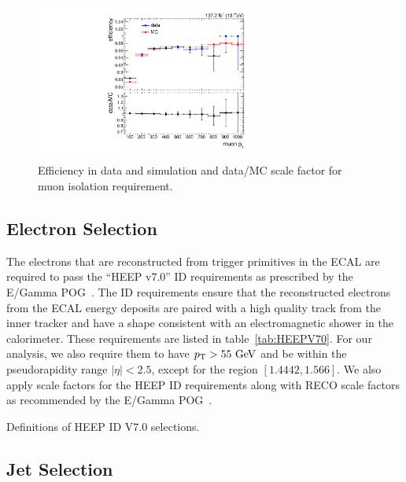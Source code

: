 \begin{figure}[htbp]
  \centering
  \includegraphics[width=0.65\textwidth]{fig/analysis/muonFullIsoSF.pdf}
  \caption{
    Efficiency in data and simulation and data/MC scale factor for muon isolation requirement.
  }
  \label{fig:muonIsoSF}
\end{figure}

\subsection{Electron Selection}
\label{subsec:elecSelect}

The electrons that are reconstructed from trigger primitives in the ECAL are required to pass the ``HEEP v7.0'' ID requirements as prescribed by the E/Gamma POG~\cite{HEEPV70}.
The ID requirements ensure that the reconstructed electrons from the ECAL energy deposits are paired with a high quality track from the inner tracker and have a shape consistent with an electromagnetic shower in the calorimeter.
These requirements are listed in table~\ref{tab:HEEPV70}.
For our analysis, we also require them to have $\pt>55\unit{GeV}$ and be within the pseudorapidity range $|\eta|<2.5$, except for the region $[1.4442,1.566]$. %
We also apply scale factors for the HEEP ID requirements along with RECO scale factors as recommended by the E/Gamma POG~\cite{EgammaScale}.

\begin{table}[htbp]
  \centering
  
  \caption{
    Definitions of HEEP ID V7.0 selections.
  }
  \label{tab:HEEPV70}
\end{table}

\subsection{Jet Selection}
\label{subsec:jetSelect}

